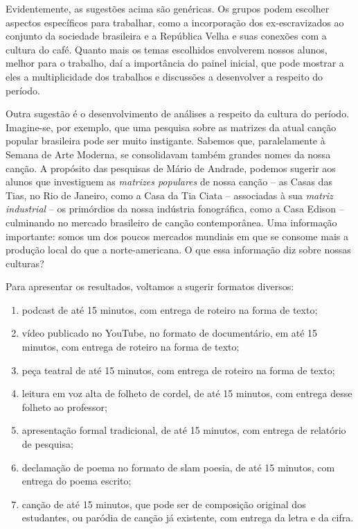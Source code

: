 \documentclass[11pt]{extarticle}
\begin{document}
Evidentemente, as sugestões acima são genéricas. Os grupos podem
escolher aspectos específicos para trabalhar, como a incorporação dos
ex-escravizados ao conjunto da sociedade brasileira e a República Velha
e suas conexões com a cultura do café. Quanto mais os temas escolhidos
envolverem nossos alunos, melhor para o trabalho, daí a importância do
painel inicial, que pode mostrar a eles a multiplicidade dos trabalhos e
discussões a desenvolver a respeito do período.

Outra sugestão é o desenvolvimento de análises a respeito da cultura do
período. Imagine-se, por exemplo, que uma pesquisa sobre as matrizes da
atual canção popular brasileira pode ser muito instigante. Sabemos que,
paralelamente à Semana de Arte Moderna, se consolidavam também grandes
nomes da nossa canção. A propósito das pesquisas de Mário de Andrade,
podemos sugerir aos alunos que investiguem as \emph{matrizes populares}
de nossa canção -- as Casas das Tias, no Rio de Janeiro, como a Casa da
Tia Ciata -- associadas à sua \emph{matriz industrial} -- os primórdios
da nossa indústria fonográfica, como a Casa Edison -- culminando no
mercado brasileiro de canção contemporânea. Uma informação importante:
somos um dos poucos mercados mundiais em que se consome mais a produção
local do que a norte-americana. O que essa informação diz sobre nossas
culturas?

Para apresentar os resultados, voltamos a sugerir formatos diversos:

\begin{enumerate}

\item podcast de até 15 minutos, com entrega de roteiro na forma de texto;

\item vídeo publicado no YouTube, no formato de documentário, em até 15
minutos, com entrega de roteiro na forma de texto;

\item peça teatral de até 15 minutos, com entrega de roteiro na forma de
texto;

\item leitura em voz alta de folheto de cordel, de até 15 minutos, com
entrega desse folheto ao professor;

\item apresentação formal tradicional, de até 15 minutos, com entrega de
relatório de pesquisa;

\item declamação de poema no formato de slam poesia, de até 15 minutos, com
entrega do poema escrito;

\item canção de até 15 minutos, que pode ser de composição original dos
estudantes, ou paródia de canção já existente, com entrega da letra e da
cifra.

\end{enumerate} 
\end{document}

